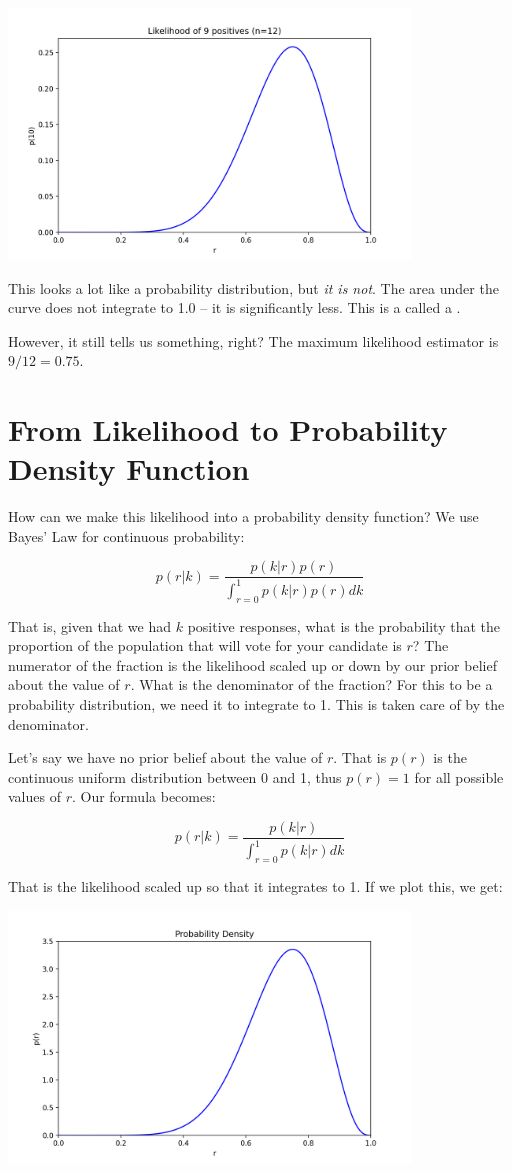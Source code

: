 \includegraphics[width=0.8\textwidth]{likelihood.png}

This looks a lot like a probability distribution, but \emph{it is not}.  The area under the curve does not integrate to 1.0 -- it is significantly less.  This is a called a .

However,  it still tells us something, right?  The maximum likelihood estimator is $9/12 = 0.75$.

\section{From Likelihood to Probability Density Function}

How can we make this likelihood into a probability density function?  We use Bayes' Law for continuous probability:

$$p(r|k)  = \frac{p(k | r) p(r)}{\int_{r = 0}^{1} p(k | r) p(r) dk}$$

That is,  given that we had $k$ positive responses,  what is the probability that the proportion of the population that will vote for your candidate is $r$?   The numerator of the fraction is the likelihood scaled up or down by our prior belief about the value of $r$.    What is the denominator of the fraction?  For this to be a probability distribution,  we need it to integrate to 1.  This is taken care of by the denominator.

Let's say we have no prior belief about the value of $r$.   That is $p(r)$ is the continuous uniform distribution between 0 and 1, thus $p(r) = 1$ for all possible values of $r$.  Our formula becomes:

$$p(r|k)  = \frac{p(k | r)}{\int_{r = 0}^{1} p(k | r) dk}$$

That is the likelihood scaled up so that it integrates to 1.  If we plot this, we get:

\includegraphics[width=0.8\textwidth]{bayes.png}

